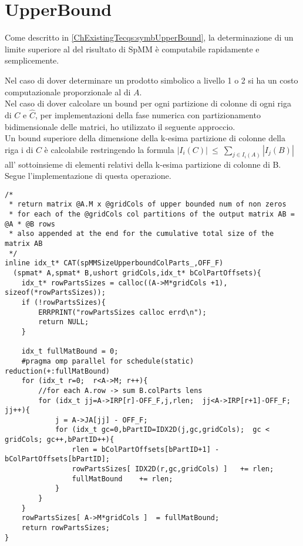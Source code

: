 \section{UpperBound} \label{chSpMMSymb:UpperBound}
Come descritto in \ref{ChExistingTecqs:symbUpperBound}, la determinazione di un limite superiore al \nnnz 
del risultato di SpMM è computabile rapidamente e semplicemente.

Nel caso di dover determinare un prodotto simbolico a livello 1 o 2 %
si ha un costo computazionale proporzionale al \nnnz di $A$.\\

Nel caso di dover calcolare un bound per ogni partizione di colonne di ogni riga di $C$ e $\hat{C}$,
per implementazioni della fase numerica con partizionamento bidimensionale delle matrici, ho utilizzato
il seguente approccio.\\
Un bound superiore della dimensione della k-esima partizione di colonne della riga i di $C$ 
è calcolabile restringendo la formula $ | I_i(C) |~\leq~\sum\limits_{ j \in I_i(A) }  | I_j(B) | $
all' sottoinsieme di elementi \nnz relativi della k-esima partizione di colonne di B.\\
Segue l'implementazione di questa operazione.\\
\begin{lstlisting}
/* 
 * return matrix @A.M x @gridCols of upper bounded num of non zeros
 * for each of the @gridCols col partitions of the output matrix AB = @A * @B rows
 * also appended at the end for the cumulative total size of the matrix AB 
 */
inline idx_t* CAT(spMMSizeUpperboundColParts_,OFF_F)
  (spmat* A,spmat* B,ushort gridCols,idx_t* bColPartOffsets){
    idx_t* rowPartsSizes = calloc((A->M*gridCols +1),  sizeof(*rowPartsSizes));
    if (!rowPartsSizes){
        ERRPRINT("rowPartsSizes calloc errd\n");
        return NULL;
    }

    idx_t fullMatBound = 0;
    #pragma omp parallel for schedule(static) reduction(+:fullMatBound)
    for (idx_t r=0;  r<A->M; r++){
        //for each A.row -> sum B.colParts lens     
        for (idx_t jj=A->IRP[r]-OFF_F,j,rlen;  jj<A->IRP[r+1]-OFF_F; jj++){
            j = A->JA[jj] - OFF_F;
            for (idx_t gc=0,bPartID=IDX2D(j,gc,gridCols);  gc < gridCols; gc++,bPartID++){
                rlen = bColPartOffsets[bPartID+1] - bColPartOffsets[bPartID];
                rowPartsSizes[ IDX2D(r,gc,gridCols) ]   += rlen;
                fullMatBound    += rlen;
            }
        }
    }
    rowPartsSizes[ A->M*gridCols ]  = fullMatBound;
    return rowPartsSizes;
}
\end{lstlisting}
